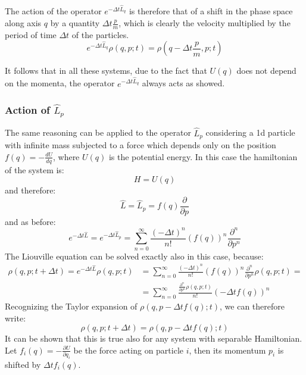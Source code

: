             The action of the operator $e^{-\Delta t \hat{L}_q}$ is therefore that of a shift in the phase space along axis $q$ by a quantity $\Delta t \frac{p}{m}$, which is clearly the velocity multiplied by the period of time $\Delta t$ of the particles.
            \begin{equation}
                e^{-\Delta t\hat{L}_q}\rho(q,p;t)=\rho(q-\Delta t \frac{p}{m},p;t)
            \end{equation}
            
             It follows that in all these systems, due to the fact that $U(q)$ does not depend on the momenta, the operator $e^{-\Delta t \hat{L}_q}$ always acts as showed.
            
            \subsubsection{Action of $\hat{L}_p$}
            The same reasoning can be applied to the operator $\hat{L}_p$ considering a 1d particle with infinite mass subjected to a force which depends only on the position $f(q)=-\frac{dU}{dq}$, where $U(q)$ is the potential energy.
            In this case the hamiltonian of the system is:
            \begin{equation}
                H=U(q)
            \end{equation}
            and therefore:
            \begin{equation}
                \hat{L}=\hat{L}_p=f(q)\frac{\partial}{\partial p}
            \end{equation}
            and as before:
            \begin{equation}
                e^{-\Delta t \hat{L}}=e^{-\Delta t \hat{L}_p}=\sum_{n=0}^\infty\frac{(-\Delta t)^n}{n!}(f(q))^n\frac{\partial^n}{\partial p^n}
            \end{equation}
            The Liouville equation can be solved exactly also in this case, because:
            \begin{align*}
                \rho(q,p;t+\Delta t)=e^{-\Delta t \hat{L}}\rho(q,p;t)&=\sum_{n=0}^\infty\frac{(-\Delta t)^n}{n!}\left(f(q)\right)^n\frac{\partial^n}{\partial p^n}\rho(q,p;t)=\\
                &=\sum_{n=0}^\infty\frac{\frac{\partial^n}{\partial p^n}\rho(q,p;t)}{n!}\left(-\Delta t f(q)\right)^n
            \end{align*}
            Recognizing the Taylor expansion of $\rho(q,p-\Delta t f(q);t)$, we can therefore write:
            \begin{equation}
                \rho(q,p;t+\Delta t)=\rho(q,p-\Delta t f(q);t)
            \end{equation}
            It can be shown that this is true also for any system with separable Hamiltonian. Let $f_i(q)=-\frac{\partial U}{\partial q_i}$ be the force acting on particle $i$, then its momentum $p_i$ is shifted by $\Delta t f_i(q)$.
            
